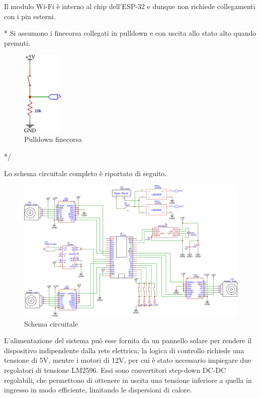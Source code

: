 \documentclass[12pt]{article}
\begin{document}
Il modulo Wi-Fi è interno al chip dell'ESP-32 e dunque non richiede collegamenti con i pin esterni.

\/*
Si assumono i finecorsa collegati in pulldown e con uscita allo stato alto quando premuti.\\

\begin{figure}[h]
\centering
    \includegraphics[width=55pt]{Draws/Pull_down.png}
    \caption{Pulldown finecorsa}
\end{figure}
*/

Lo schema circuitale completo è riportato di seguito.
\begin{figure}[h]
\centering
    \includegraphics[width=\textwidth]{Draws/Schematic.png}
    \caption{Schema circuitale}
\end{figure}

L'alimentazione del sistema può esse fornita da un pannello solare per rendere il dispositivo indipendente dalla rete elettrica; la logica di controllo richiede una tensione di 5V, mentre i motori di 12V, per cui è stato necessario impiegare due regolatori di tensione LM2596. Essi sono convertitori step-down DC-DC regolabili, che permettono di ottenere in uscita una tensione inferiore a quella in ingresso in modo efficiente, limitando le dispersioni di calore.


\newpage
\end{document}

